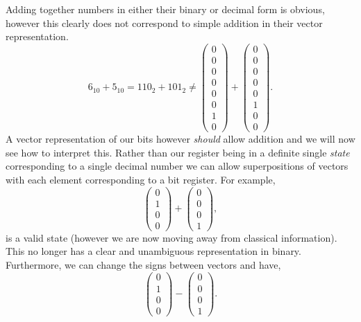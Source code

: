 Adding together numbers in either their binary or decimal form is obvious, however this clearly does not correspond to simple addition in their vector representation. 
\begin{equation}
    6_{10} + 5_{10} = 110_2 + 101_2 \neq  \begin{pmatrix} 0 \\ 0 \\ 0 \\ 0 \\ 0 \\ 0 \\ 1 \\ 0 \end{pmatrix} + \begin{pmatrix} 0 \\ 0 \\ 0 \\ 0 \\ 0 \\ 1 \\ 0 \\ 0 \end{pmatrix}.
\end{equation}
A vector representation of our bits however \textit{should} allow addition and we will now see how to interpret this. Rather than our register being in a definite single \textit{state} corresponding to a single decimal number we can allow superpositions of vectors with each element corresponding to a bit register. For example,
\begin{equation}
    \begin{pmatrix} 0 \\ 1 \\ 0 \\ 0 \end{pmatrix} + \begin{pmatrix} 0 \\ 0 \\ 0 \\ 1  \end{pmatrix},
\end{equation}
is a valid state (however we are now moving away from classical information). This no longer has a clear and unambiguous representation in binary. Furthermore, we can change the signs between vectors and have,
\begin{equation}
    \begin{pmatrix} 0 \\ 1 \\ 0 \\ 0 \end{pmatrix} - \begin{pmatrix} 0 \\ 0 \\ 0 \\ 1  \end{pmatrix}.
\end{equation}
